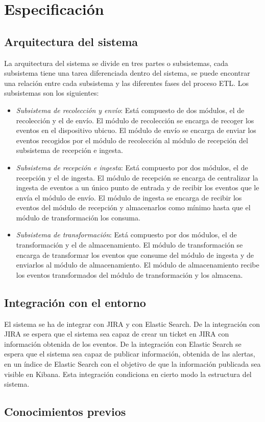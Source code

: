 \chapter{Especificación}

\section{Arquitectura del sistema}
La arquitectura del sistema se divide en tres partes o subsistemas, cada subsistema tiene una tarea diferenciada dentro del sistema, se puede encontrar una relación entre cada subsistema y las diferentes fases del proceso ETL. Los subsistemas son los siguientes:

\begin{itemize}
	\item \textit{Subsistema de recolección y envío}: Está compuesto de dos módulos, el de recolección y el de envío. El módulo de recolección se encarga de recoger los eventos en el dispositivo ubicuo. El módulo de envío se encarga de enviar los eventos recogidos por el módulo de recolección al módulo de recepción del subsistema de recepción e ingesta.
	
	\item \textit{Subsistema de recepción e ingesta}: Está compuesto por dos módulos, el de recepción y el de ingesta. El módulo de recepción se encarga de centralizar la ingesta de eventos a un único punto de entrada y  de recibir los eventos que le envía el módulo de envío. El módulo de ingesta se encarga de recibir los eventos del módulo de recepción y almacenarlos como mínimo hasta que el módulo de transformación los consuma.

	\item \textit{Subsistema de transformación}:  Está compuesto por dos módulos, el de transformación y el de almacenamiento. El módulo de transformación se encarga de transformar los eventos que consume del módulo de ingesta y de enviarlos al módulo de almacenamiento. El módulo de almacenamiento recibe los eventos transformados del módulo de transformación y los almacena.
\end{itemize}


\section{Integración con el entorno}
El sistema se ha de integrar con JIRA y con Elastic Search. De la integración con JIRA se espera que el sistema sea capaz de crear un ticket en JIRA con información obtenida de los eventos. De la integración con Elastic Search se espera que el sistema sea capaz de publicar información, obtenida de las alertas, en un índice de Elastic Search con el objetivo de que la información publicada sea visible en Kibana. Esta integración condiciona en cierto modo la estructura del sistema.

\section{Conocimientos previos}